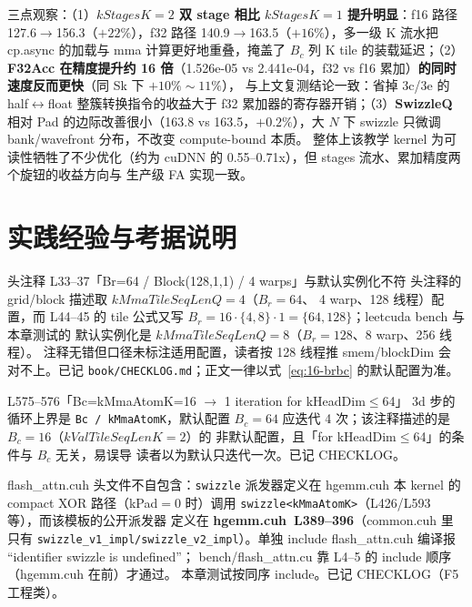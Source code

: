 三点观察：（1）\textbf{$kStagesK{=}2$ 双 stage 相比 $kStagesK{=}1$
提升明显}：f16 路径 127.6$\to$156.3（$+22\%$），f32 路径
140.9$\to$163.5（$+16\%$），多一级 K 流水把 cp.async 的加载与
mma 计算更好地重叠，掩盖了 $B_c$ 列 K tile 的装载延迟；（2）
\textbf{F32Acc 在精度提升约 16 倍}（1.526e-05 vs 2.441e-04，f32
vs f16 累加）\textbf{的同时速度反而更快}（同 Sk 下 $+10\%\sim11\%$），
与上文复测结论一致：省掉 3c/3e 的 half$\leftrightarrow$float
整簇转换指令的收益大于 f32 累加器的寄存器开销；（3）\textbf{SwizzleQ}
相对 Pad 的边际改善很小（163.8 vs 163.5，$+0.2\%$），大 $N$ 下
swizzle 只微调 bank/wavefront 分布，不改变 compute-bound 本质。
整体上该教学 kernel 为可读性牺牲了不少优化（约为 cuDNN 的
0.55--0.71x），但 stages 流水、累加精度两个旋钮的收益方向与
生产级 FA 实现一致。

\section{实践经验与考据说明}

\begin{kaogu}[F5 配置口径]{头注释 L33--37「Br=64 / Block(128,1,1) / 4 warps」与默认实例化不符}
  头注释的 grid/block 描述取 $kMmaTileSeqLenQ{=}4$（$B_r{=}64$、
  4 warp、128 线程）配置，而 L44--45 的 tile 公式又写
  $B_r = 16\cdot\{4,8\}\cdot1 = \{64,128\}$；leetcuda bench 与本章测试的
  默认实例化是 $kMmaTileSeqLenQ{=}8$（$B_r{=}128$、8 warp、256 线程）。
  注释无错但口径未标注适用配置，读者按 128 线程推 smem/blockDim 会
  对不上。已记 \texttt{book/\allowbreak{}CHECKLOG.\allowbreak{}md}；正文一律以式~\ref{eq:16-brbc}
  的默认配置为准。
\end{kaogu}

\begin{kaogu}[F5 陈旧注释]{L575--576「Bc=kMmaAtomK=16 $\to$ 1 iteration for kHeadDim$\le$64」}
  3d 步的循环上界是 \texttt{Bc / kMmaAtomK}，默认配置 $B_c{=}64$
  应迭代 4 次；该注释描述的是 $B_c{=}16$（$kValTileSeqLenK{=}2$）的
  非默认配置，且「for kHeadDim$\le$64」的条件与 $B_c$ 无关，易误导
  读者以为默认只迭代一次。已记 CHECKLOG。
\end{kaogu}

\begin{kaogu}[工程观察]{flash\_attn.cuh 头文件不自包含：\texttt{swizzle} 派发器定义在 hgemm.cuh}
  本 kernel 的 compact XOR 路径（kPad$=$0 时）调用
  \texttt{swizzle\allowbreak{}<k\allowbreak{}Mma\allowbreak{}Atom\allowbreak{}K>}（L426/L593 等），而该模板的公开派发器
  定义在 \textbf{hgemm.cuh~L389--396}（common.cuh 里只有
  \texttt{swizzle\_\allowbreak{}v1\_\allowbreak{}impl/\allowbreak{}swizzle\_\allowbreak{}v2\_\allowbreak{}impl}）。单独 include
  flash\_attn.cuh 编译报 ``identifier swizzle is undefined''；
  bench/flash\_attn.cu 靠 L4--5 的 include 顺序（hgemm.cuh 在前）才通过。
  本章测试按同序 include。已记 CHECKLOG（F5 工程类）。
\end{kaogu}

